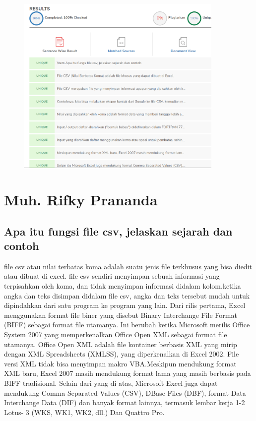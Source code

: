 \begin{figure}[H]
	\includegraphics[width=10cm]{figures/4/1174031/Teori/plagiat.png}
	\centering
\end{figure}



\section{Muh. Rifky Prananda}
\subsection{Apa itu fungsi file csv, jelaskan sejarah dan contoh}
file csv atau nilai terbatas koma adalah suatu jenis file terkhusus yang bisa diedit atau dibuat di excel. file csv sendiri menyimpan sebuah informasi yang terpisahkan oleh koma, dan tidak menyimpan informasi didalam kolom.ketika angka dan teks disimpan didalam file csv, angka dan teks tersebut mudah untuk dipindahkan dari satu program ke program yang lain.
Dari rilis pertama, Excel menggunakan format file biner yang disebut Binary Interchange File Format (BIFF) sebagai format file utamanya. Ini berubah ketika Microsoft merilis Office System 2007 yang memperkenalkan Office Open XML sebagai format file utamanya. Office Open XML adalah file kontainer berbasis XML yang mirip dengan XML Spreadsheets (XMLSS), yang diperkenalkan di Excel 2002. File versi XML tidak bisa menyimpan makro VBA.Meskipun mendukung format XML baru, Excel 2007 masih mendukung format lama yang masih berbasis pada BIFF tradisional. Selain dari yang di atas, Microsoft Excel juga dapat mendukung Comma Separated Values (CSV), DBase Files (DBF), format Data Interchange Data (DIF) dan banyak format lainnya, termasuk lembar kerja 1-2 Lotus- 3 (WKS, WK1, WK2, dll.) Dan Quattro Pro.


